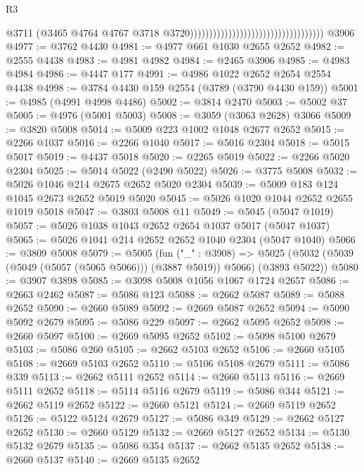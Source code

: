 \begin{lexlean}{R3}
\begin{coremodule}
                                                                        @3711
                                                                        (@3465
                                                                          @4764
                                                                          @4767
                                                                          @3718
                                                                          @3720)))))))))))))))))))))))))))))))))))
    @3906
@4977 := @3762 @4430
@4981 := @4977 @661 @1030 @2655 @2652
@4982 := @2555 @4438
@4983 := @4981 @4982
@4984 := @2465 @3906
@4985 := @4983 @4984
@4986 := @4447 @177
@4991 := @4986 @1022 @2652 @2654 @2554 @4438
@4998 := @3784 @4430 @159 @2554 (@3789 (@3790 @4430 @159))
@5001 := @4985 (@4991 @4998 @4486)
@5002 := @3814 @2470
@5003 := @5002 @37
@5005 := @4976 (@5001 @5003)
@5008 := @3059 (@3063 @2628) @3066
@5009 := @3820 @5008
@5014 := @5009 @223 @1002 @1048 @2677 @2652
@5015 := @2266 @1037
@5016 := @2266 @1040
@5017 := @5016 @2304
@5018 := @5015 @5017
@5019 := @4437 @5018
@5020 := @2265 @5019
@5022 := @2266 @5020 @2304
@5025 := @5014 @5022 (@2490 @5022)
@5026 := @3775 @5008
@5032 := @5026 @1046 @214 @2675 @2652 @5020 @2304
@5039 := @5009 @183 @124 @1045 @2673 @2652 @5019 @5020
@5045 := @5026 @1020 @1044 @2652 @2655 @1019 @5018
@5047 := @3803 @5008 @11
@5049 := @5045 (@5047 @1019)
@5057 := @5026 @1038 @1043 @2652 @2654 @1037 @5017 (@5047 @1037)
@5065 := @5026 @1041 @214 @2652 @2652 @1040 @2304 (@5047 @1040)
@5066 := @3809 @5008
@5079 := @5005
    (fun ("_" : @3908) =>
    @5025 (@5032 (@5039 (@5049 (@5057 (@5065 @5066))) (@3887 @5019)) @5066) (@3893 @5022))
@5080 := @3907 @3898
@5085 := @3098 @5008 @1056 @1067 @1724 @2657
@5086 := @2663 @2462
@5087 := @5086 @123
@5088 := @2662 @5087
@5089 := @5088 @2652
@5090 := @2660 @5089
@5092 := @2669 @5087 @2652
@5094 := @5090 @5092 @2679
@5095 := @5086 @229
@5097 := @2662 @5095 @2652
@5098 := @2660 @5097
@5100 := @2669 @5095 @2652
@5102 := @5098 @5100 @2679
@5103 := @5086 @260
@5105 := @2662 @5103 @2652
@5106 := @2660 @5105
@5108 := @2669 @5103 @2652
@5110 := @5106 @5108 @2679
@5111 := @5086 @339
@5113 := @2662 @5111 @2652
@5114 := @2660 @5113
@5116 := @2669 @5111 @2652
@5118 := @5114 @5116 @2679
@5119 := @5086 @344
@5121 := @2662 @5119 @2652
@5122 := @2660 @5121
@5124 := @2669 @5119 @2652
@5126 := @5122 @5124 @2679
@5127 := @5086 @349
@5129 := @2662 @5127 @2652
@5130 := @2660 @5129
@5132 := @2669 @5127 @2652
@5134 := @5130 @5132 @2679
@5135 := @5086 @354
@5137 := @2662 @5135 @2652
@5138 := @2660 @5137
@5140 := @2669 @5135 @2652

\end{coremodule}
\end{lexlean}
